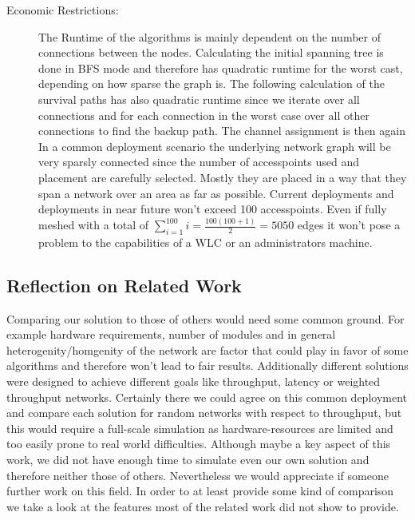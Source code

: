 \begin{description}
	\item[Economic Restrictions:]
	  The Runtime of the algorithms is mainly dependent on the number of connections between the nodes. Calculating the initial spanning tree is done in BFS mode and 
	  therefore has quadratic runtime for the worst cast, depending on how sparse the graph is. The following calculation of the survival paths has also quadratic runtime 
	  since we iterate over all connections and for each connection in the worst case over all other connections to find the backup path. The channel assignment is then again
	  In a common deployment scenario the underlying network graph will be very sparsly connected since the number of accesspoints used and placement are carefully selected.
	  Mostly they are placed in a way that they span a network over an area as far as possible.
	  Current deployments and deployments in near future won't exceed 100 accesspoints. 
	  Even if fully meshed with a total of \(\sum \limits_{i=1}^{100} i = \frac{100(100+1)}{2}=5050\)
	  edges it won't pose a problem to the capabilities of a WLC or an administrators machine.
	  
      \end{description}
      
\newpage
      
    \subsection{Reflection on Related Work}
      Comparing our solution to those of others would need some common ground. For example hardware requirements, number of modules and in general heterogenity/homgenity of
      the network are factor that could play in favor of some algorithms and therefore won't lead to fair results. Additionally different solutions were designed to 
      achieve different goals like throughput, latency or weighted throughput networks. Certainly there we could agree on this common deployment and compare each solution for random
      networks with respect to throughput, but this would require a full-scale simulation as hardware-resources are limited and too easily prone to real world difficulties.
      Although maybe a key aspect of this work, we did not have enough time to simulate even our own solution and therefore neither those of others. Nevertheless we would appreciate
      if someone further work on this field. In order to at least provide some kind of comparison we take a look at the features most of the related work did not show to provide.

